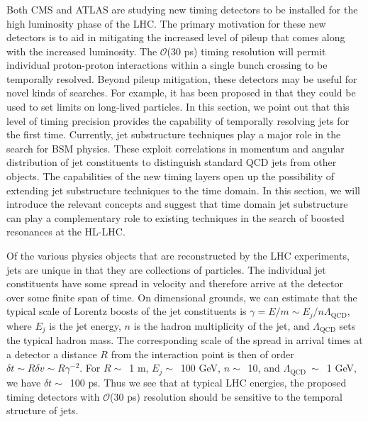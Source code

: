 \subsubsection{}
\label{sec:theoryboostedtiming}

Both CMS and ATLAS are studying new timing detectors to be installed for the high luminosity phase of the LHC. 
The primary motivation for these new detectors is to aid in mitigating the increased level of pileup that comes along with the increased luminosity.
The $\mathcal O$(30 ps) timing resolution will permit individual proton-proton interactions within a single bunch crossing to be temporally resolved.
Beyond pileup mitigation, these detectors may be useful for novel kinds of searches.
For example, it has been proposed in  that they could be used to set limits on long-lived particles.
In this section, we point out that this level of timing precision provides the capability of temporally resolving jets for the first time.
Currently, jet substructure techniques play a major role in the search for BSM physics.
These exploit correlations in momentum and angular distribution of jet constituents to distinguish standard QCD jets from other objects.
The capabilities of the new timing layers open up the possibility of extending jet substructure techniques to the time domain.
In this section, we will introduce the relevant concepts and suggest that time domain jet substructure can play a complementary role to existing techniques in the search of boosted resonances at the HL-LHC.

Of the various physics objects that are reconstructed by the LHC experiments, jets are unique in that they are collections of particles.
The individual jet constituents have some spread in velocity and therefore arrive at the detector over some finite span of time.
On dimensional grounds, we can estimate that the typical scale of Lorentz boosts of the jet constituents is $\gamma = E/m \sim E_j/n\Lambda_\mathrm{QCD}$, where $E_j$ is the jet energy, $n$ is the hadron multiplicity of the jet, and $\Lambda_\mathrm{QCD}$ sets the typical hadron mass.
The corresponding scale of the spread in arrival times at a detector a distance $R$ from the interaction point is then of order $\delta t\sim R\delta v\sim R\gamma^{-2}$. 
For $R\sim$~1 m, $E_j\sim$~100 GeV, $n\sim$~10, and $\Lambda_\mathrm{QCD}~\sim$~1 GeV, we have $\delta t\sim$~100 ps.
Thus we see that at typical LHC energies, the proposed timing detectors with $\mathcal O$(30 ps) resolution should be sensitive to the temporal structure of jets.

